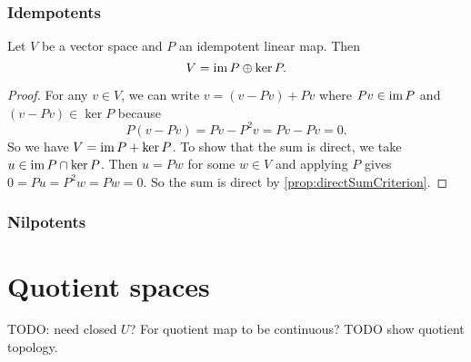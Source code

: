 \subsubsection{Idempotents}
\begin{proposition} \label{prop:directSumKernelImageIdempotent}
Let $V$ be a vector space and $P$ an idempotent linear map. Then
\[ V = \operatorname{im} P \oplus \ker P. \]
\end{proposition}
\begin{proof}
For any $v\in V$, we can write $v= (v-Pv)+Pv$ where $Pv\in \operatorname{im} P$ and $(v-Pv)\in \ker P$ because
\[ P(v-Pv) = Pv- P^2v = Pv - Pv = 0. \]
So we have $V = \operatorname{im} P + \ker P$. To show that the sum is direct, we take $u\in \operatorname{im} P \cap \ker P$. Then $u = Pw$ for some $w\in V$ and applying $P$ gives $0 = Pu = P^2w = Pw = 0$. So the sum is direct by \ref{prop:directSumCriterion}.
\end{proof}
\subsubsection{Nilpotents}


\section{Quotient spaces}
TODO: need closed $U$? For quotient map to be continuous? TODO show quotient topology.

